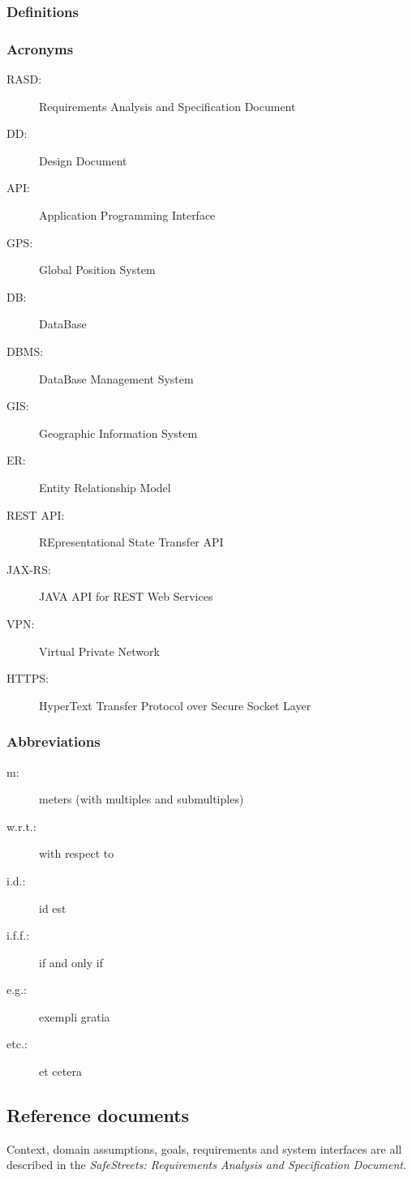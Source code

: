 \subsubsection{Definitions}
	
\subsubsection{Acronyms}
	\begin{description}
		\item [RASD:] Requirements Analysis and Specification Document
		\item [DD:] Design Document
		\item [API:] Application Programming Interface
		\item [GPS:] Global Position System
		\item [DB:] DataBase
		\item [DBMS:] DataBase Management System
		\item [GIS:] Geographic Information System
		\item [ER:] Entity Relationship Model
		\item [REST API:] REpresentational State Transfer API
		\item [JAX-RS:] JAVA API for REST Web Services
		\item [VPN:] Virtual Private Network
		\item [HTTPS:] HyperText Transfer Protocol over Secure Socket Layer
	\end{description}
\subsubsection{Abbreviations}
	\begin{description}
		\item [m:] meters (with multiples and submultiples)
		\item [w.r.t.:] with respect to
		\item [i.d.:] id est
		\item [i.f.f.:] if and only if
		\item [e.g.:] exempli gratia
		\item [etc.:] et cetera
	\end{description}

\subsection{Reference documents}
Context, domain assumptions, goals, requirements and system interfaces are all described in the \emph{SafeStreets: Requirements Analysis and Specification Document}. \cite{RASD}\\

